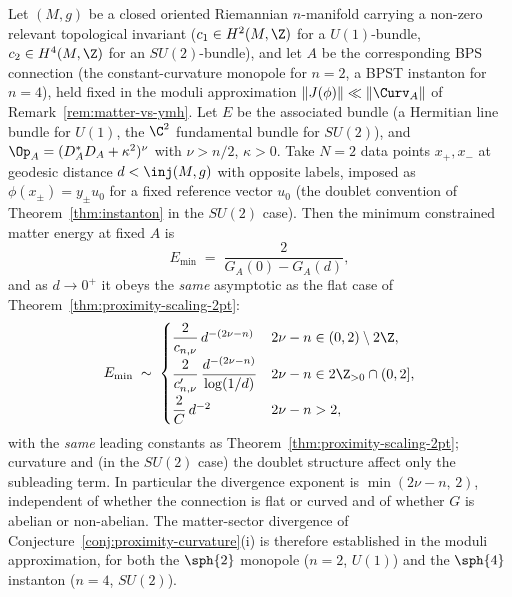 \begin{theorem}
\label{thm:proximity-scaling-curved}
Let $(M,g)$ be a closed oriented Riemannian $n$-manifold carrying a
non-zero relevant topological invariant ($c_1\in H^2(M,\Z)$ for a
$U(1)$-bundle, $c_2\in H^4(M,\Z)$ for an $SU(2)$-bundle), and let $A$
be the corresponding BPS connection (the constant-curvature monopole
for $n=2$, a BPST instanton for $n=4$), held fixed in the moduli
approximation $\|J(\phi)\|\ll\|\Curv_A\|$ of
Remark~\ref{rem:matter-vs-ymh}. Let $E$ be the associated bundle
(a Hermitian line bundle for $U(1)$, the $\C^2$ fundamental bundle for
$SU(2)$), and $\Op_A=(D_A^*D_A+\kappa^2)^\nu$ with $\nu>n/2$,
$\kappa>0$. Take $N=2$ data points $x_+,x_-$ at geodesic distance
$d<\inj(M,g)$ with opposite labels, imposed as
$\phi(x_\pm)=y_\pm u_0$ for a fixed reference vector $u_0$ (the
doublet convention of Theorem~\ref{thm:instanton} in the $SU(2)$
case). Then the minimum constrained matter energy at fixed $A$ is
\[
   E_{\min} \;=\; \frac{2}{G_A(0)-G_A(d)},
\]
and as $d\to 0^+$ it obeys the \emph{same} asymptotic as the flat
case of Theorem~\ref{thm:proximity-scaling-2pt}:
\[
   E_{\min}\;\sim\;
   \begin{cases}
      \dfrac{2}{c_{n,\nu}}\,d^{-(2\nu-n)}
        & 2\nu-n\in(0,2)\setminus 2\Z,\\[6pt]
      \dfrac{2}{c_{n,\nu}'}\,\dfrac{d^{-(2\nu-n)}}{\log(1/d)}
        & 2\nu-n\in 2\Z_{>0}\cap(0,2],\\[8pt]
      \dfrac{2}{C}\,d^{-2} & 2\nu-n>2,
   \end{cases}
\]
with the \emph{same} leading constants as
Theorem~\ref{thm:proximity-scaling-2pt}; curvature and (in the
$SU(2)$ case) the doublet structure affect only the subleading term.
In particular the divergence exponent is $\min(2\nu-n,\,2)$,
independent of whether the connection is flat or curved and of whether
$G$ is abelian or non-abelian. The matter-sector divergence of
Conjecture~\ref{conj:proximity-curvature}(i) is therefore established
in the moduli approximation, for both the $\sph{2}$ monopole
($n=2$, $U(1)$) and the $\sph{4}$ instanton ($n=4$, $SU(2)$).
\end{theorem}

